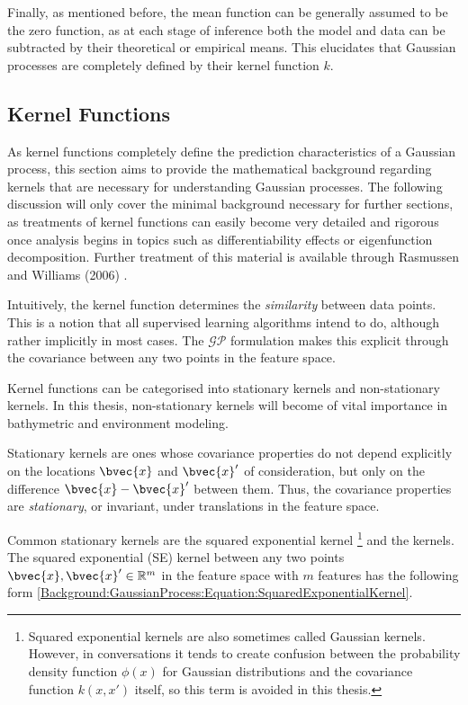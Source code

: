 			Finally, as mentioned before, the mean function can be generally assumed to be the zero function, as at each stage of inference both the model and data can be subtracted by their theoretical or empirical means. This elucidates that Gaussian processes are completely defined by their kernel function $k$. 
			
			\FloatBarrier
			
		\subsection{Kernel Functions}
		\label{Background:GaussianProcesses:KernelFunctions}
		
			As kernel functions completely define the prediction characteristics of a Gaussian process, this section aims to provide the mathematical background regarding kernels that are necessary for understanding Gaussian processes. The following discussion will only cover the minimal background necessary for further sections, as treatments of kernel functions can easily become very detailed and rigorous once analysis begins in topics such as differentiability effects or eigenfunction decomposition. Further treatment of this material is available through Rasmussen and Williams (2006) \cite{GaussianProcessForMachineLearning}. 
			
			Intuitively, the kernel function determines the \textit{similarity} between data points. This is a notion that all supervised learning algorithms intend to do, although rather implicitly in most cases. The $\mathcal{GP}$ formulation makes this explicit through the covariance between any two points in the feature space.
			
			Kernel functions can be categorised into stationary kernels and non-stationary kernels. In this thesis, non-stationary kernels will become of vital importance in bathymetric and environment modeling. 
			
			Stationary kernels are ones whose covariance properties do not depend explicitly on the locations $\bvec{x}$ and $\bvec{x}'$ of consideration, but only on the difference $\bvec{x} - \bvec{x}'$ between them. Thus, the covariance properties are \textit{stationary}, or invariant, under translations in the feature space.
			
			Common stationary kernels are the squared exponential kernel \footnote{Squared exponential kernels are also sometimes called Gaussian kernels. However, in conversations it tends to create confusion between the probability density function $\phi(x)$ for Gaussian distributions and the covariance function $k(x, x')$ itself, so this term is avoided in this thesis.} and the \matern kernels. The squared exponential (SE) kernel between any two points $\bvec{x}, \bvec{x}' \in \mathbb{R}^{m}$ in the feature space with $m$ features has the following form \eqref{Background:GaussianProcess:Equation:SquaredExponentialKernel}.
			

